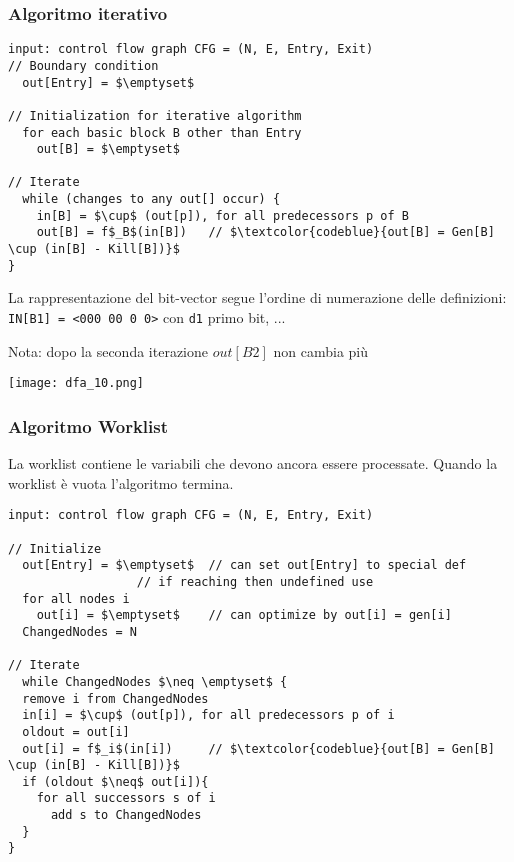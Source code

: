 \subsubsection{Algoritmo iterativo}

\begin{lstlisting}
input: control flow graph CFG = (N, E, Entry, Exit)
// Boundary condition
  out[Entry] = $\emptyset$

// Initialization for iterative algorithm
  for each basic block B other than Entry
    out[B] = $\emptyset$

// Iterate
  while (changes to any out[] occur) {
    in[B] = $\cup$ (out[p]), for all predecessors p of B
    out[B] = f$_B$(in[B])   // $\textcolor{codeblue}{out[B] = Gen[B] \cup (in[B] - Kill[B])}$
}\end{lstlisting}

\begin{example}[frametitle={Esempio di eseguzione}]
  \noindent\begin{minipage}[c]{.45\textwidth}
    \begin{emphasize-blue}
      La rappresentazione del bit-vector segue l'ordine di numerazione delle definizioni: \lstinline|IN[B1] = <000 00 0 0>| con \lstinline|d1| primo bit, ...
    \end{emphasize-blue}

    Nota: dopo la seconda iterazione $out[B2]$ non cambia pi\`u
  \end{minipage}
  \begin{minipage}[c]{.55\textwidth}
    \texttt{[image: dfa\_10.png]}
  \end{minipage}
\end{example}

\subsubsection{Algoritmo Worklist}

La worklist contiene le variabili che devono ancora essere processate. Quando la worklist \`e vuota l'algoritmo termina.

\begin{lstlisting}
input: control flow graph CFG = (N, E, Entry, Exit)

// Initialize
  out[Entry] = $\emptyset$  // can set out[Entry] to special def
                  // if reaching then undefined use
  for all nodes i
    out[i] = $\emptyset$    // can optimize by out[i] = gen[i]
  ChangedNodes = N

// Iterate
  while ChangedNodes $\neq \emptyset$ {
  remove i from ChangedNodes
  in[i] = $\cup$ (out[p]), for all predecessors p of i
  oldout = out[i]
  out[i] = f$_i$(in[i])     // $\textcolor{codeblue}{out[B] = Gen[B] \cup (in[B] - Kill[B])}$
  if (oldout $\neq$ out[i]){
    for all successors s of i
      add s to ChangedNodes
  }
}\end{lstlisting}

